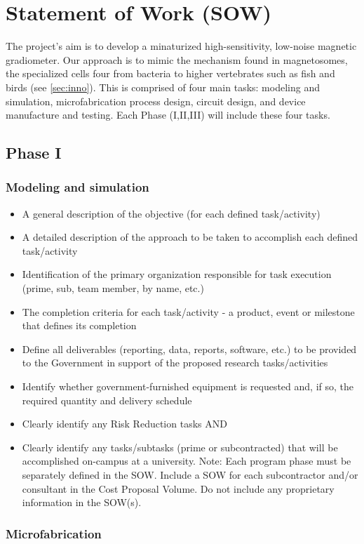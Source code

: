 
\section{Statement of Work (SOW)}
The project's aim is to develop a minaturized high-sensitivity, low-noise magnetic gradiometer. Our approach is to mimic the mechanism found in magnetosomes, the specialized cells four from bacteria to higher vertebrates such as fish and birds (see \ref{sec:inno}). This is comprised of four main tasks: modeling and simulation, microfabrication process design, circuit design, and device manufacture and testing. Each Phase (I,II,III) will include these four tasks.
\subsection{Phase I}
\subsubsection{Modeling and simulation}
\begin{itemize}
\item A general description of the objective (for each defined task/activity)
\item A detailed description of the approach to be taken to accomplish each defined task/activity
\item Identification of the primary organization responsible for task execution (prime, sub, team member, by name, etc.)
\item The completion criteria for each task/activity - a product, event or milestone that defines its completion
\item Define all deliverables (reporting, data, reports, software, etc.) to be provided to the Government in support of the proposed research tasks/activities
\item Identify whether government-furnished equipment is requested and, if so, the required quantity and delivery schedule
\item Clearly identify any Risk Reduction tasks AND
\item Clearly identify any tasks/subtasks (prime or subcontracted) that will be accomplished on-campus at a university.
Note: Each program phase must be separately defined in the SOW. Include a SOW for each
subcontractor and/or consultant in the Cost Proposal Volume. Do not include any proprietary
information in the SOW(s).
\end{itemize}
\subsubsection{Microfabrication}
